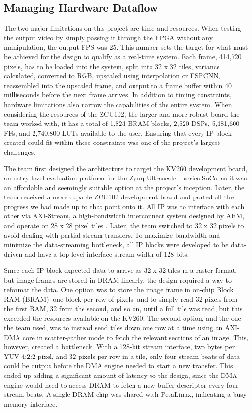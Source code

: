 \documentclass{article}
\begin{document}
    \subsection{Managing Hardware Dataflow}
        \noindent The two major limitations on this project are time and resources. When testing the output video by simply passing it through the FPGA without any manipulation, the output FPS was 25. This number sets the target for what must be achieved for the design to qualify as a real-time system. Each frame, 414,720 pixels, has to be loaded into the system, split into 32 x 32 tiles, variance calculated, converted to RGB, upscaled using interpolation or FSRCNN, reassembled into the upscaled frame, and output to a frame buffer within 40 milliseconds before the next frame arrives. In addition to timing constraints, hardware limitations also narrow the capabilities of the entire system. When considering the resources of the ZCU102, the larger and more robust board the team worked with, it has a total of 1,824 BRAM blocks, 2,520 DSPs, 5,481,600 FFs, and 2,740,800 LUTs available to the user. Ensuring that every IP block created could fit within these constraints was one of the project's largest challenges. 
        \par The team first designed the architecture to target the KV260 development board, an entry-level evaluation platform for the Zynq Ultrascale+ series SoCs, as it was an affordable and seemingly suitable option at the project's inception. Later, the team received a more capable ZCU102 development board and ported all the progress we had made up to that point onto it. All IP was to interface with each other via AXI-Stream, a high-bandwidth interconnect system designed by ARM, and operate on 28 x 28 pixel tiles \cite{noauthor_amba_2021}. Later, the team switched to 32 x 32 pixels to avoid dealing with partial stream transfers. To maximize bandwidth and minimize the data-streaming bottleneck, all IP blocks were developed to be data-driven and have a top-level interface stream width of 128 bits.
        \par Since each IP block expected data to arrive as 32 x 32 tiles in a raster format, but image frames are stored in DRAM linearly, the design required a way to reformat the data. One option was to store the image frame in on-chip Block RAM (BRAM), one block per row of pixels, and to simply read 32 pixels from the first RAM, 32 from the second, and so on, until a full tile was read, but this exceeded the resources available on the KV260. The second option, and the one the team used, was to instead send tiles down one row at a time using an AXI-DMA core in scatter-gather mode to fetch the relevant sections of an image. This, however, created a bottleneck. With a 128-bit stream interface, two bytes per YUV 4:2:2 pixel, and 32 pixels per row in a tile, only four stream beats of data could be output before the DMA engine needed to start a new transfer. This ended up adding a significant amount of latency to the design, since the DMA engine would need to access DRAM to fetch a new buffer descriptor every four stream beats. A single DRAM chip was shared with PetaLinux, indicating a busy memory interface. 
\end{document}
